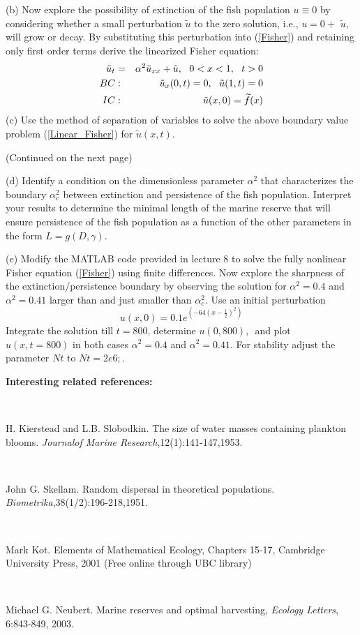 \documentclass[12pt]{article}
\begin{document}
(b) Now explore the possibility of extinction of the fish population $%
u\equiv 0$ by considering whether a small perturbation $\widetilde{u}$ to
the zero solution, i.e., $u=0+$ $\widetilde{u},$ will grow or decay. By
substituting this perturbation into (\ref{Fisher}) and retaining only first
order terms derive the linearized Fisher equation:%
\begin{eqnarray}
\tilde{u}_{t} &=&\alpha ^{2}\tilde{u}_{xx}+\tilde{u},~~0<x<1,~~t>0
\label{Linear_Fisher} \\
BC &:&\tilde{u}_{x}(0,t)=0,\text{ \ }\tilde{u}(1,t)=0  \notag \\
IC &:&\tilde{u}(x,0)=\widetilde{f}(x)  \notag
\end{eqnarray}%
(c) Use the method of separation of variables to solve the above boundary
value problem (\ref{Linear_Fisher}) for $\tilde{u}(x,t)$.\bigskip \bigskip

\begin{center}
(Continued on the next page)\pagebreak
\end{center}

(d) Identify a condition on the dimensionless parameter $\alpha ^{2}$ that
characterizes the boundary $\alpha _{c}^{2}$ between extinction and
persistence of the fish population. Interpret your results to determine the
minimal length of the marine reserve that will ensure persistence of the
fish population as a function of the other parameters in the form $%
L=g(D,\gamma ).$

(e) Modify the MATLAB code provided in lecture 8 to solve the fully
nonlinear Fisher equation (\ref{Fisher}) using finite differences. Now
explore the sharpness of the extinction/persistence boundary by observing
the solution for $\alpha ^{2}=0.4$ and $\alpha ^{2}=0.41$ larger than and
just smaller than $\alpha _{c}^{2}.$ Use an initial perturbation 
\begin{equation*}
u(x,0)=0.1e^{(-64(x-\frac{1}{2})^{2})}
\end{equation*}%
Integrate the solution till $t=800$, determine $u(0,800),$\ and plot $%
u(x,t=800)$ in both cases $\alpha ^{2}=0.4$ and $\alpha ^{2}=0.41$. For
stability adjust the parameter $Nt$ to $Nt=2e6;.$


\vskip 1cm

\textbf{Interesting related references:}

\

H. Kierstead and L.B. Slobodkin. The size of water masses containing plankton blooms. \textit{Journalof Marine Research},12(1):141-147,1953.

\

John G. Skellam. Random dispersal in theoretical populations. \textit{Biometrika},38(1/2):196-218,1951.

\

Mark Kot. Elements of Mathematical Ecology, Chapters 15-17, Cambridge University Press, 2001 (Free online through UBC library)

\

Michael G. Neubert. Marine reserves and optimal harvesting, \textit{Ecology Letters}, 6:843-849, 2003.
\end{document}
